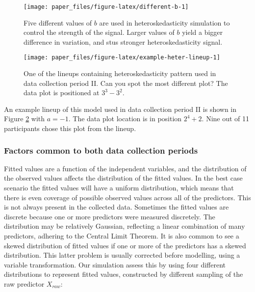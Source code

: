 \documentclass[]{interact}
\theoremstyle{plain}%
\theoremstyle{definition}
\theoremstyle{remark}
\begin{document}
\begin{figure}[!h]

{\centering \texttt{[image: paper\_files/figure-latex/different-b-1]} 

}

\caption{Five different values of $b$ are used in heteroskedasticity simulation to control the strength of the signal. Larger values of $b$ yield a bigger difference in variation, and stus stronger heteroskedasticity signal.}\label{fig:different-b}
\end{figure}

\begin{figure}[t!]

{\centering \texttt{[image: paper\_files/figure-latex/example-heter-lineup-1]} 

}

\caption{One of the lineups containing heteroskedasticity pattern used in data collection period II. Can you spot the most different plot? The data plot is positioned at $3^3 - 3^2$.}\label{fig:example-heter-lineup}
\end{figure}

An example lineup of this model used in data collection period II is
shown in Figure \ref{fig:example-heter-lineup} with \(a = -1\). The data
plot location is in position \(2^4 + 2\). Nine out of 11 participants
chose this plot from the lineup.

\hypertarget{factors-common-to-both-data-collection-periods}{%
\subsubsection{Factors common to both data collection
periods}\label{factors-common-to-both-data-collection-periods}}

Fitted values are a function of the independent variables, and the
distribution of the observed values affects the distribution of the
fitted values. In the best case scenario the fitted values will have a
uniform distribution, which means that there is even coverage of
possible observed values across all of the predictors. This is not
always present in the collected data. Sometimes the fitted values are
discrete because one or more predictors were measured discretely. The
distribution may be relatively Gaussian, reflecting a linear combination
of many predictors, adhering to the Central Limit Theorem. It is also
common to see a skewed distribution of fitted values if one or more of
the predictors has a skewed distribution. This latter problem is usually
corrected before modelling, using a variable transformation. Our
simulation assess this by using four different distributions to
represent fitted values, constructed by different sampling of the raw
predictor \(X_{raw}\):
\end{document}
